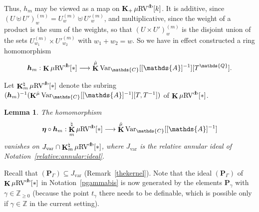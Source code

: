 \documentclass[12pt]{amsart}
\theoremstyle{plain}
\newtheorem{lem}[thm]{Lemma}
\theoremstyle{definition}
\theoremstyle{remark}
\numberwithin{equation}{section}
\theoremstyle{plain}
\newcommand{\RV}{\textup{RV}}
\newcommand{\Z}{\mathds{Z}}
\newcommand{\A}{\mathds{A}}
\newcommand{\C}{\mathds{C}}
\newcommand{\Q}{\mathds{Q}}
\newcommand{\0}{\emptyset}
\newcommand{\fun}{\longrightarrow}
\newcommand{\sub}{\subseteq}
\newcommand{\mgRV}{{\mu}{\RV}}
\DeclareMathOperator{\gsk}{\mathbf{K}_+}
\DeclareMathOperator{\ggk}{\mathbf{K}}
\DeclareMathOperator{\db}{d \! b}
\newcommand{\var}{\textup{Var}}
\newcommand{\gmv}{\ggk^{\hat \mu}\var_{\C}}
\begin{document}
Thus, $h_m$ may be viewed as a map on $\gsk \mgRV^{\db}[k]$. It is additive, since $(U \uplus U')^{(m)}_w = U^{(m)}_w \uplus U'^{(m)}_w$, and multiplicative, since the weight of a product is the sum of the weights, so that $(U \times U')^{(m)}_w$ is the disjoint union of the sets $U^{(m)}_{w_1} \times U'^{(m)}_{w_2}$ with $w_1 + w_2 = w$. So we have in effect constructed a ring homomorphism
\[
\bm h_m : \ggk \mgRV^{\db}[*] \fun  \ggk^{\hat \mu} \var_{\C}[[\A]^{-1}][T^{\Q}].
\]

Let $\ggk^\natural_m \mgRV^{\db}[*]$ denote the subring $(\bm h_m)^{-1}(\gmv[[\A]^{-1}][T, T^{-1}])$ of $\ggk \mgRV^{\db}[*]$.

\begin{lem}\label{PG:van}
The homomorphism
\[
\bm \eta \circ \bm h_m : \ggk^\natural_m \mgRV^{\db}[*] \fun \gmv[[\A]^{-1}]
\]
vanishes on $J_{\mathrm{var}} \cap \ggk^\natural_m \mgRV^{\db}[*]$, where $J_{\mathrm{var}}$ is the relative annular ideal of Notation~\ref{relative:annular:ideal}.
\end{lem}
Recall that $(\bm P_\Gamma) \sub J_{\mathrm{var}}$ (Remark~\ref{thekernel}). Note that the ideal $(\bm P_\Gamma)$ of $\ggk \mgRV^{\db}[*]$ in Notation~\ref{pgammabis} is now generated by the elements $\bm P_\gamma$ with $\gamma \in \Z_{\geq 0}$ (because the point $t_\gamma$ there needs to be definable, which is possible only if $\gamma \in \Z$ in the current setting).
\end{document}
